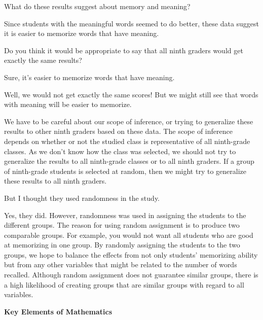 {\begin{scriptlist}
      \item [Teacher:] What do these results suggest about memory and meaning?

      \item [Student N:] Since students with the meaningful words seemed to do better, these data suggest it is easier to memorize words that have meaning.

      \item [Teacher:] Do you think it would be appropriate to say that all ninth graders would get exactly the same results?

      \item [Student O:] Sure, it's easier to memorize words that have meaning.

      \item [Student P:] Well, we would not get exactly the same scores! But we might still see that words with meaning will be easier to memorize.

      \item [Teacher:] We have to be careful about our scope of inference, or trying to generalize these results to other ninth graders based on these data. The scope of inference depends on whether or not the studied class is representative of all ninth-grade classes. As we don't know how the class was selected, we should not try to generalize the results to all ninth-grade classes or to all ninth graders. If a group of ninth-grade students is selected at random, then we might try to generalize these results to all ninth graders.

      \item [Student Q:] But I thought they used randomness in the study.

      \item [Teacher:] Yes, they did. However, randomness was used in assigning the students to the different groups. The reason for using random assignment is to produce two comparable groups. For example, you would not want all students who are good at memorizing in one group. By randomly assigning the students to the two groups, we hope to balance the effects from not only students' memorizing ability but from any other variables that might be related to the number of words recalled. Although random assignment does not guarantee similar groups, there is a high likelihood of creating groups that are similar groups with regard to all variables.
    \end{scriptlist}

    \textbf{Key Elements of Mathematics}

}
